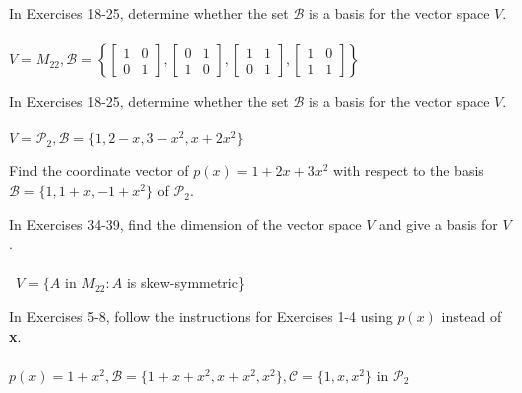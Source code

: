\documentclass[12pt,letterpaper]{hmcpset}
\newcommand{\m}[1]{\begin{bmatrix} #1 \end{bmatrix}}
\begin{document}

\begin{problem}[6.2.20]
    In Exercises 18-25, determine whether the set $\mathcal{B}$ is a
    basis for the vector space $V$.\\\\
    $V=M_{22},\mathcal{B}=\left\{\m{1&0\\0&1},\m{0&1\\1&0},\m{1&1\\0&1},
    \m{1&0\\1&1}\right\}$
\end{problem}
\begin{solution}
    \vfill
\end{solution}
\newpage

\begin{problem}[6.2.25]
    In Exercises 18-25, determine whether the set $\mathcal{B}$ is a
    basis for the vector space $V$.\\\\
    $V=\mathscr{P}_2,\mathcal{B}=\{1,2-x,3-x^2,x+2x^2\}$
\end{problem}
\begin{solution}
    \vfill
\end{solution}
\newpage

\begin{problem}[6.2.28]
    Find the coordinate vector of $p(x)=1+2x+3x^2$ with respect to the basis
    $\mathcal{B}=\{1,1+x,-1+x^2\}$ of $\mathscr{P}_2$.
\end{problem}
\begin{solution}
    \vfill
\end{solution}
\newpage

\begin{problem}[6.2.38]
    In Exercises 34-39, find the dimension of the vector space $V$ and give a
    basis for $V$.\\\\\
    $V=\{A$ in $M_{22}:A$ is skew-symmetric\}
\end{problem}
\begin{solution}
    \vfill
\end{solution}
\newpage

\begin{problem}[6.3.7]
    In Exercises 5-8, follow the instructions for Exercises 1-4 using $p(x)$
    instead of \textbf{x}.\\\\
    $p(x)=1+x^2,\mathcal{B}=\{1+x+x^2,x+x^2,x^2\},\mathcal{C}=\{1,x,x^2\}$ in
    $\mathscr{P}_2$
\end{problem}
\begin{solution}
    \vfill
\end{solution}
\newpage
\end{document}
